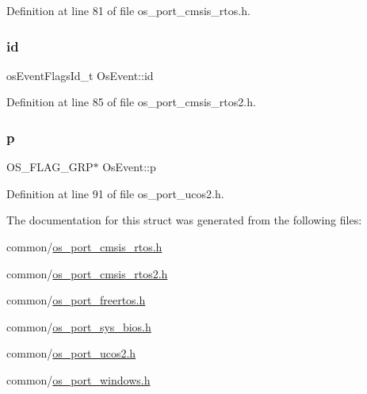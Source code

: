 Definition at line 81 of file os\+\_\+port\+\_\+cmsis\+\_\+rtos.\+h.

\mbox{\label{structOsEvent_a615dfc18e81f59d1718cee2055777d87}} 
\subsubsection{\texorpdfstring{id}{id}\hspace{0.1cm}{\footnotesize\ttfamily [2/2]}}
{\footnotesize\ttfamily os\+Event\+Flags\+Id\+\_\+t Os\+Event\+::id}



Definition at line 85 of file os\+\_\+port\+\_\+cmsis\+\_\+rtos2.\+h.

\mbox{\label{structOsEvent_aa8c2fd2730a7f70ca645deba365fb1e1}} 
\subsubsection{\texorpdfstring{p}{p}}
{\footnotesize\ttfamily O\+S\+\_\+\+F\+L\+A\+G\+\_\+\+G\+RP$\ast$ Os\+Event\+::p}



Definition at line 91 of file os\+\_\+port\+\_\+ucos2.\+h.



The documentation for this struct was generated from the following files\+:\begin{DoxyCompactItemize}
\item 
common/\hyperlink{os__port__cmsis__rtos_8h}{os\+\_\+port\+\_\+cmsis\+\_\+rtos.\+h}\item 
common/\hyperlink{os__port__cmsis__rtos2_8h}{os\+\_\+port\+\_\+cmsis\+\_\+rtos2.\+h}\item 
common/\hyperlink{os__port__freertos_8h}{os\+\_\+port\+\_\+freertos.\+h}\item 
common/\hyperlink{os__port__sys__bios_8h}{os\+\_\+port\+\_\+sys\+\_\+bios.\+h}\item 
common/\hyperlink{os__port__ucos2_8h}{os\+\_\+port\+\_\+ucos2.\+h}\item 
common/\hyperlink{os__port__windows_8h}{os\+\_\+port\+\_\+windows.\+h}\end{DoxyCompactItemize}
